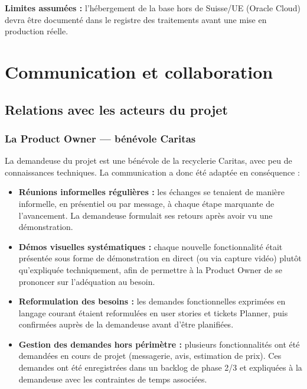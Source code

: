 \documentclass[12pt, a4paper]{report}
\renewcommand{\_}{\origunderscore\allowbreak}
\begin{document}
\noindent \textbf{Limites assumées :} l'hébergement de la base hors de Suisse/UE (Oracle Cloud) devra être documenté dans le registre des traitements avant une mise en production réelle.

\chapter{Communication et collaboration}

\section{Relations avec les acteurs du projet}

\subsection{La Product Owner — bénévole Caritas}

La demandeuse du projet est une bénévole de la recyclerie Caritas, avec peu de connaissances techniques. La communication a donc été adaptée en conséquence :

\begin{itemize}
    \item \textbf{Réunions informelles régulières :} les échanges se tenaient de manière informelle, en présentiel ou par message, à chaque étape marquante de l'avancement. La demandeuse formulait ses retours après avoir vu une démonstration.
    \item \textbf{Démos visuelles systématiques :} chaque nouvelle fonctionnalité était présentée sous forme de démonstration en direct (ou via capture vidéo) plutôt qu'expliquée techniquement, afin de permettre à la Product Owner de se prononcer sur l'adéquation au besoin.
    \item \textbf{Reformulation des besoins :} les demandes fonctionnelles exprimées en langage courant étaient reformulées en user stories et tickets Planner, puis confirmées auprès de la demandeuse avant d'être planifiées.
    \item \textbf{Gestion des demandes hors périmètre :} plusieurs fonctionnalités ont été demandées en cours de projet (messagerie, avis, estimation de prix). Ces demandes ont été enregistrées dans un backlog de phase 2/3 et expliquées à la demandeuse avec les contraintes de temps associées.
\end{itemize}
\end{document}
